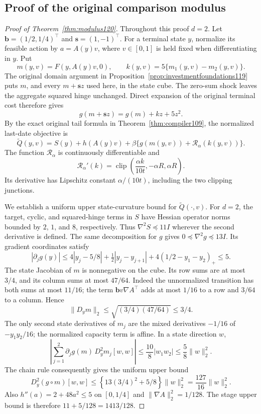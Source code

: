 \subsection{Proof of the original comparison modulus}
\begin{proof}[Proof of Theorem~\ref{thm:modulus120}]
Throughout this proof $d=2$.  Let
$\boldsymbol b=(1/2,1/4)^\top$ and $\boldsymbol s=(1,-1)^\top$.
For a terminal state $y$, normalize its feasible action by
$a=A(y)v$, where $v\in[0,1]$ is held fixed when differentiating
in $y$.  Put
\[
 m(y,v)=F(y,A(y)v,0),\qquad
 k(y,v)=5\{m_1(y,v)-m_2(y,v)\}.
 \]
The original domain argument in
Proposition~\ref{prop:investmentfoundations119} puts $m$, and
every $m+\boldsymbol s z$ used here, in the state cube.
The zero-sum shock leaves the aggregate squared hinge unchanged.
Direct expansion of the original terminal cost therefore gives
\[
 g(m+\boldsymbol s z)=g(m)+kz+5z^2.
\]
By the exact original tail formula in
Theorem~\ref{thm:compiler109}, the normalized last-date objective is
\[
 \widetilde Q(y,v)=S(y)+h(A(y)v)
             +\beta\{g(m(y,v))+\mathcal R_\alpha(k(y,v))\}.
\]
The function $\mathcal R_\alpha$ is continuously differentiable and
\[
 \mathcal R_\alpha'(k)
   =\operatorname{clip}\left(\frac{\alpha k}{10t},
                                      -\alpha R,\alpha R\right).
 \]
Its derivative has Lipschitz constant $\alpha/(10t)$, including
the two clipping junctions.

We establish a uniform upper state-curvature bound for
$\widetilde Q(\cdot,v)$.  For $d=2$, the target, cyclic, and
squared-hinge terms in $S$ have Hessian operator norms bounded by
$2$, $1$, and $8$, respectively.  Thus
$\nabla^2S\preceq11I$ wherever the second derivative is defined.
The same decomposition for $g$ gives
$0\preceq\nabla^2g\preceq13I$.
Its gradient coordinates satisfy
\[
 |\partial_jg(y)|
 \le 4|y_j-5/8|+\tfrac12|y_j-y_{j+1}|
                  +4(1/2-y_1-y_2)_+
 \le5.
\]
The state Jacobian of $m$ is nonnegative on the cube.  Its row
sums are at most $3/4$, and its column sums at most $47/64$.
Indeed the unnormalized transition has both sums at most $11/16$;
the term $\boldsymbol b v\nabla A^\top$ adds at most $1/16$
to a row and $3/64$ to a column.  Hence
\[
 \|D_y m\|_2\le\sqrt{(3/4)(47/64)}\le3/4.
\]
The only second state derivatives of $m_j$ are the mixed
derivatives $-1/16$ of $-y_1y_2/16$; the normalized capacity term
is affine.  In a state direction $w$,
\[
 \left|\sum_{j=1}^2\partial_jg(m)\,
                         D_y^2m_j[w,w]\right|
 \le \frac{10}{8}|w_1w_2|
 \le\frac58\|w\|_2^2.
\]
The chain rule consequently gives the uniform upper bound
\[
 D_y^2(g\circ m)[w,w]
 \le\left\{13(3/4)^2+5/8\right\}\|w\|_2^2
 =\frac{127}{16}\|w\|_2^2.
\]
Also $h''(a)=2+48a^2\le5$ on $[0,1/4]$ and
$\|\nabla A\|_2^2=1/128$.  The stage upper bound is therefore
$11+5/128=1413/128$.


\end{proof}
